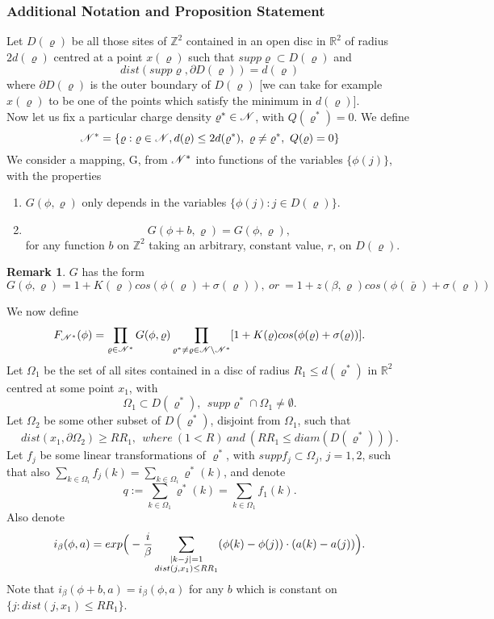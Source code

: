 \documentclass[11pt,reqno]{article}
\DeclarePairedDelimiter\abs{\lvert}{\rvert}%
\theoremstyle{definition}
\newtheorem*{remark}{Remark}
\numberwithin{equation}{section}
\begin{document}
\subsubsection{Additional Notation and Proposition Statement}
Let $D(\varrho)$ be all those sites of $\mathbb{Z}^2$ contained in an open disc in $\mathbb{R}^2$ of radius $2d(\varrho)$ centred at a point $x(\varrho)$ such that $supp\varrho \subset D(\varrho)$ and
$$
dist(supp\varrho, \partial D(\varrho)) = d(\varrho)
$$
where $\partial D(\varrho)$ is the outer boundary of $D(\varrho)$ [we can take for example $x(\varrho)$ to be one of the points which satisfy the minimum in $d(\varrho)$].\\
Now let us fix a particular charge density $\varrho^* \in \mathscr{N}$, with $Q(\varrho^*)=0$.
We define 
$$
\mathscr{N}^* = \{\varrho: \varrho \in \mathscr{N}, d(\varrho)\leq 2d(\varrho^*),\ \varrho \neq \varrho^*,\  Q(\varrho)=0\}
$$
We consider a mapping, G, from $\mathscr{N}^*$ into functions of the variables $\{ \phi(j) \}$, with the properties
\begin{enumerate}
\item $G(\phi, \varrho)$ only depends in the variables $\{ \phi(j): j \in D(\varrho) \}$.
\item 
\begin{equation} \label{lab:eq428}
G(\phi + b, \varrho) = G(\phi, \varrho), 
\end{equation}
for any function $b$ on $\mathbb{Z}^2$ taking an arbitrary, constant value, $r$, on $D(\varrho)$.
\end{enumerate}

\begin{remark}
$G$ has the form 
$$G(\phi, \varrho) = 1+K(\varrho)cos(\phi(\varrho) + \sigma(\varrho)),\ or\ =1+z(\beta, \varrho)cos(\phi(\bar{\varrho}) + \sigma(\varrho))
$$
\end{remark}
We now define
$$
F_{\mathscr{N}^*}(\phi) = \prod_{\varrho \in \mathscr{N}^*} G(\phi, \varrho)
\prod_{\varrho^* \neq \varrho \in \mathscr{N} \setminus \mathscr{N}^*}[1+K(\varrho)cos(\phi(\varrho) + \sigma(\varrho))].
$$
Let $\Omega_1$ be the set of all sites contained in a disc of radius $R_1 \leq d(\varrho^*)$ in $\mathbb{R}^2$ centred at some point $x_1$, with
$$
\Omega_1 \subset D(\varrho^*), \ \ supp\varrho^* \cap \Omega_1 \neq \emptyset.
$$
Let $\Omega_2$ be some other subset of $D(\varrho^*)$, disjoint from $\Omega_1$, such that
$$
dist(x_1, \partial\Omega_2) \geq RR_1, \ \ where \ (1 < R) \ and\ (RR_1 \leq diam(D(\varrho^*))).
$$ 
Let $f_j$ be some linear transformations of $\varrho^*$, with $suppf_j \subset \Omega_j$, $j=1,2$, such that also $\sum_{k \in \Omega_i}f_j(k) = \sum_{k \in \Omega_i}\varrho^*(k)$, and denote
\begin{equation} \label{label:qdef}
q := \sum_{k \in \Omega_1}\varrho^*(k) = \sum_{k \in \Omega_1}f_1(k).
\end{equation}
Also denote 
$$
i_\beta(\phi, a) = exp\Big(-\frac{i}{\beta} \sum_{\substack{\abs{k-j}=1 \\ dist(j,x_1) \leq RR_1}} (\phi(k)-\phi(j)) \cdot (a(k)-a(j))\Big).
$$
Note that $i_\beta(\phi+b, a) = i_\beta(\phi, a)$ for any $b$ which is constant on $\{j: dist(j,x_1) \leq RR_1\} $.
\end{document}

